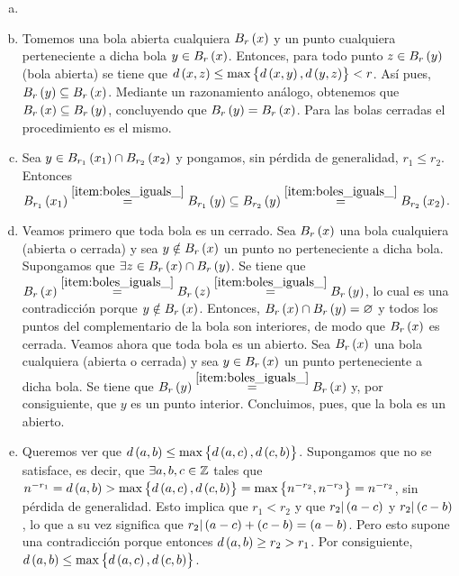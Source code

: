 \begin{eje}
    \begin{enumerate}[(a)] \item[]
        \item \label{item:boles_iguals_} Tomemos una bola abierta cualquiera $B_r \left( x \right)$ y un punto cualquiera perteneciente a dicha bola $y\in B_r\left( x \right)$. Entonces, para todo punto $z \in B_r \left( y \right)$ (bola abierta) se tiene que $d\left( x, z \right) \leq \max \left\{ d \left( x, y \right), d \left( y, z \right) \right\} < r $. Así pues, $B_r \left( y \right) \subseteq B_r \left( x \right)$. Mediante un razonamiento análogo, obtenemos que $B_r \left( x \right) \subseteq B_r \left( y \right)$, concluyendo que $B_r \left( y \right) = B_r \left( x \right)$. Para las bolas cerradas el procedimiento es el mismo.
        \item Sea $y \in B_{r_1}\left( x_1 \right) \cap B_{r_2}\left( x_2 \right)$ y pongamos, sin pérdida de generalidad, $r_1\leq r_2$. Entonces $B_{r_1}\left( x_1 \right) \stackrel{ \ref{item:boles_iguals_}}{=} B_{r_1}\left( y \right) \subseteq B_{r_2}\left( y \right) \stackrel{\ref{item:boles_iguals_}}{=} B_{r_2}\left( x_2 \right)$.
        \item Veamos primero que toda bola es un cerrado. Sea $B_r\left( x \right)$ una bola cualquiera (abierta o cerrada) y sea $y\notin B_r \left( x \right)$ un punto no perteneciente a dicha bola. Supongamos que $\exists z \in B_r\left( x \right) \cap B_r\left( y \right)$. Se tiene que $B_r\left( x \right) \stackrel{\ref{item:boles_iguals_}}{=} B_r\left( z \right) \stackrel{\ref{item:boles_iguals_}}{=} B_r\left( y \right)$, lo cual es una contradicción porque $y\notin B_r\left( x \right)$. Entonces, $B_r\left( x \right) \cap B_r\left( y \right) = \varnothing$ y todos los puntos del complementario de la bola son interiores, de modo que $B_r\left( x \right)$ es cerrada. Veamos ahora que toda bola es un abierto. Sea $B_r\left( x \right)$ una bola cualquiera (abierta o cerrada) y sea $y\in B_r \left( x \right)$ un punto perteneciente a dicha bola. Se tiene que $B_r\left( y \right) \stackrel{\ref{item:boles_iguals_}}{=} B_r\left( x \right) $ y, por consiguiente, que $y$ es un punto interior. Concluimos, pues, que la bola es un abierto.
        \item Queremos ver que $d \left( a, b \right) \leq \max \left\{ d \left( a, c \right), d\left( c, b \right) \right\}$. Supongamos que no se satisface, es decir, que $\exists a, b, c \in \mathbb{Z}$ tales que $n^{-r_1} = d \left( a, b \right) > \max \left\{ d \left( a, c \right), d\left( c, b \right) \right\} = \max \left\{ n^{-r_2}, n^{-r_3} \right\} = n^{-r_2}$, sin pérdida de generalidad. Esto implica que $r_1<r_2$ y que $r_2 | \left( a-c \right) $ y $r_2 | \left( c-b \right)$, lo que a su vez significa que $r_2 | \left( a-c \right) + \left( c-b \right) = \left( a-b \right)$. Pero esto supone una contradicción porque entonces $d\left( a, b \right) \geq r_2 > r_1$. Por consiguiente, $d \left( a, b \right) \leq \max \left\{ d \left( a, c \right), d\left( c, b \right) \right\}$.

\end{enumerate}
\end{eje}
